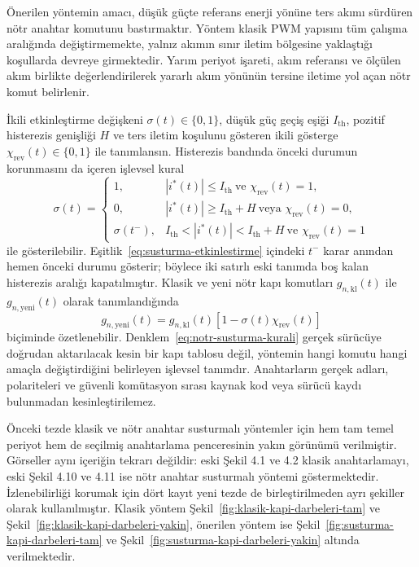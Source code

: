Önerilen yöntemin amacı, düşük güçte referans enerji yönüne ters akımı sürdüren nötr anahtar komutunu bastırmaktır. Yöntem klasik PWM yapısını tüm çalışma aralığında değiştirmemekte, yalnız akımın sınır iletim bölgesine yaklaştığı koşullarda devreye girmektedir. Yarım periyot işareti, akım referansı ve ölçülen akım birlikte değerlendirilerek yararlı akım yönünün tersine iletime yol açan nötr komut belirlenir.

İkili etkinleştirme değişkeni $\sigma(t)\in\{0,1\}$, düşük güç geçiş eşiği $I_{\mathrm{th}}$, pozitif histerezis genişliği $H$ ve ters iletim koşulunu gösteren ikili gösterge $\chi_{\mathrm{rev}}(t)\in\{0,1\}$ ile tanımlansın. Histerezis bandında önceki durumun korunmasını da içeren işlevsel kural
\begin{equation}
  \sigma(t)=
  \begin{cases}
    1, & |i^{\ast}(t)|\leq I_{\mathrm{th}}\ \text{ve }\chi_{\mathrm{rev}}(t)=1,\\
    0, & |i^{\ast}(t)|\geq I_{\mathrm{th}}+H\ \text{veya }\chi_{\mathrm{rev}}(t)=0,\\
    \sigma(t^-), & I_{\mathrm{th}}<|i^{\ast}(t)|<I_{\mathrm{th}}+H\ \text{ve }\chi_{\mathrm{rev}}(t)=1
  \end{cases}
  \label{eq:susturma-etkinlestirme}
\end{equation}
ile gösterilebilir. Eşitlik~\eqref{eq:susturma-etkinlestirme} içindeki $t^-$ karar anından hemen önceki durumu gösterir; böylece iki satırlı eski tanımda boş kalan histerezis aralığı kapatılmıştır. Klasik ve yeni nötr kapı komutları $g_{n,\mathrm{kl}}(t)$ ile $g_{n,\mathrm{yeni}}(t)$ olarak tanımlandığında
\begin{equation}
  g_{n,\mathrm{yeni}}(t)=g_{n,\mathrm{kl}}(t)\left[1-\sigma(t)\chi_{\mathrm{rev}}(t)\right]
  \label{eq:notr-susturma-kurali}
\end{equation}
biçiminde özetlenebilir. Denklem~\eqref{eq:notr-susturma-kurali} gerçek sürücüye doğrudan aktarılacak kesin bir kapı tablosu değil, yöntemin hangi komutu hangi amaçla değiştirdiğini belirleyen işlevsel tanımdır. Anahtarların gerçek adları, polariteleri ve güvenli komütasyon sırası kaynak kod veya sürücü kaydı bulunmadan kesinleştirilemez.

Önceki tezde klasik ve nötr anahtar susturmalı yöntemler için hem tam temel periyot hem de seçilmiş anahtarlama penceresinin yakın görünümü verilmiştir. Görseller aynı içeriğin tekrarı değildir: eski Şekil 4.1 ve 4.2 klasik anahtarlamayı, eski Şekil 4.10 ve 4.11 ise nötr anahtar susturmalı yöntemi göstermektedir. İzlenebilirliği korumak için dört kayıt yeni tezde de birleştirilmeden ayrı şekiller olarak kullanılmıştır. Klasik yöntem Şekil~\ref{fig:klasik-kapi-darbeleri-tam} ve Şekil~\ref{fig:klasik-kapi-darbeleri-yakin}, önerilen yöntem ise Şekil~\ref{fig:susturma-kapi-darbeleri-tam} ve Şekil~\ref{fig:susturma-kapi-darbeleri-yakin} altında verilmektedir.

